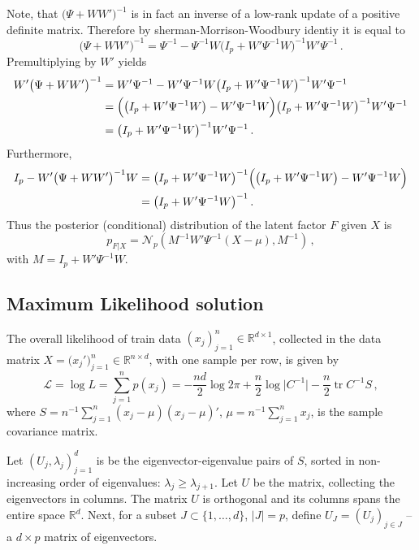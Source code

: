 \documentclass[a4paper,14pt]{article}
\newcommand{\Real}{\mathbb{R}}
\begin{document}
Note, that $\bigl(\Psi + WW'\bigr)^{-1}$ is in fact an inverse of a low-rank update of
a positive definite matrix. Therefore by sherman-Morrison-Woodbury identiy it is equal to
$$ \bigl(\Psi + WW'\bigr)^{-1} 
    = \Psi^{-1} - \Psi^{-1} W\bigl(I_p + W'\Psi^{-1}W\bigr)^{-1}W'\Psi^{-1}
    \,. $$
Premultiplying by $W'$ yields
\begin{align*}
W' \bigl(\Psi + WW'\bigr)^{-1} 
    &= W'\Psi^{-1} - W'\Psi^{-1} W\bigl(I_p + W'\Psi^{-1}W\bigr)^{-1}W'\Psi^{-1}\\
    &= \Bigl(\bigl(I_p + W'\Psi^{-1}W\bigr) - W'\Psi^{-1} W\Bigr)
       \bigl(I_p + W'\Psi^{-1}W\bigr)^{-1}W'\Psi^{-1} \\
    &= \bigl(I_p + W'\Psi^{-1}W\bigr)^{-1}W'\Psi^{-1} \,.
\end{align*}
Furthermore, 
\begin{align*}
I_p - W' \bigl(\Psi + WW'\bigr)^{-1} W
    &= \bigl(I_p + W'\Psi^{-1}W\bigr)^{-1} \Bigl(\bigl(I_p + W'\Psi^{-1}W\bigr)-W'\Psi^{-1} W\Bigr)\\
    &= \bigl(I_p + W'\Psi^{-1}W\bigr)^{-1}\,.
\end{align*}
Thus the posterior (conditional) distribution of the latent factor $F$ given $X$ is
$$ p_{F|X} = \mathcal{N}_p(M^{-1}W'\Psi^{-1}(X-\mu),M^{-1}) \,,$$
with $M = I_p + W'\Psi^{-1}W$.

\subsection{Maximum Likelihood solution} %
\label{sub:maximum_likelihood_solution}

The overall likelihood of train data $(x_j)_{j=1}^n\in \Real^{d\times 1}$,
collected in the data matrix $X = \bigl(x_j'\bigr)_{j=1}^n\in\Real^{n\times d}$,
with one sample per row, is given by
$$ \mathcal{L}
    = \log L
    = \sum_{j=1}^n p(x_j)
    = -\frac{nd}{2}\log 2\pi + \frac{n}{2} \log \lvert C^{-1}\rvert
        - \frac{n}{2} \mathop{\text{tr}}\nolimits{C^{-1}S}
    \,, $$
where $S = n^{-1}\sum_{j=1}^n (x_j-\mu)(x_j-\mu)'$, $\mu = n^{-1} \sum_{j=1}^n x_j$,
is the sample covariance matrix.

Let $(U_j, \lambda_j)_{j=1}^d$ is be the eigenvector-eigenvalue pairs of $S$, sorted
in non-increasing order of eigenvalues: $\lambda_j\geq \lambda_{j+1}$. Let $U$ be
the matrix, collecting the eigenvectors in columns. The matrix $U$ is orthogonal and
its columns spans the entire space $\Real^d$. Next, for a subset $J\subset\{1,\ldots,d\}$,
$\lvert J\rvert = p$, define $U_J = (U_j)_{j\in J}$ -- a $d\times p$ matrix of eigenvectors.
\end{document}
